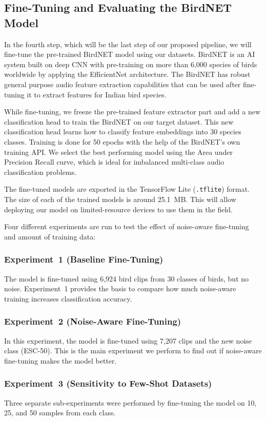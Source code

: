 \documentclass[conference]{IEEEtran}
\begin{document}
\subsection{Fine-Tuning and Evaluating the BirdNET Model}

In the fourth step, which will be the last step of our proposed pipeline, we will fine-tune the pre-trained BirdNET model using our datasets. BirdNET is an AI system built on deep CNN with pre-training on more than 6,000 species of birds worldwide by applying the EfficientNet architecture. The BirdNET has robust general purpose audio feature extraction capabilities that can be used after fine-tuning it to extract features for Indian bird species.

While fine-tuning, we freeze the pre-trained feature extractor part and add a new classification head to train the BirdNET on our target dataset. This new classification head learns how to classify feature embeddings into 30 species classes. Training is done for 50 epochs with the help of the BirdNET's own training API. We select the best performing model using the Area under Precision Recall curve, which is ideal for imbalanced multi-class audio classification problems.

The fine-tuned models are exported in the TensorFlow Lite (\texttt{.tflite}) format. The size of each of the trained models is around 25.1~MB. This will allow deploying our model on limited-resource devices to use them in the field.

Four different experiments are run to test the effect of noise-aware fine-tuning and amount of training data:

\subsubsection{Experiment~1 (Baseline Fine-Tuning)}
The model is fine-tuned using 6,924 bird clips from 30 classes of birds, but no noise. Experiment~1 provides the basis to compare how much noise-aware training increases classification accuracy.

\subsubsection{Experiment~2 (Noise-Aware Fine-Tuning)}
In this experiment, the model is fine-tuned using 7,207 clips and the new noise class (ESC-50). This is the main experiment we perform to find out if noise-aware fine-tuning makes the model better.

\subsubsection{Experiment~3 (Sensitivity to Few-Shot Datasets)}
Three separate sub-experiments were performed by fine-tuning the model on 10, 25, and 50 samples from each class.
\end{document}
